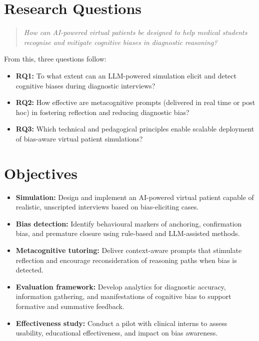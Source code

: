\section{Research Questions}
\label{sec:rq}

\begin{quote}
\textit{How can AI-powered virtual patients be designed to help medical students recognise and mitigate cognitive biases in diagnostic reasoning?}
\end{quote}

From this, three questions follow:

\begin{itemize}
  \item \textbf{RQ1:} To what extent can an LLM-powered simulation elicit and detect cognitive biases during diagnostic interviews?
  \item \textbf{RQ2:} How effective are metacognitive prompts (delivered in real time or post hoc) in fostering reflection and reducing diagnostic bias?
  \item \textbf{RQ3:} Which technical and pedagogical principles enable scalable deployment of bias-aware virtual patient simulations?
\end{itemize}

\section{Objectives}
\label{sec:ae2}

\begin{itemize}
  \item \textbf{Simulation:} Design and implement an AI-powered virtual patient capable of realistic, unscripted interviews based on bias-eliciting cases.
  \item \textbf{Bias detection:} Identify behavioural markers of anchoring, confirmation bias, and premature closure using rule-based and LLM-assisted methods.
  \item \textbf{Metacognitive tutoring:} Deliver context-aware prompts that stimulate reflection and encourage reconsideration of reasoning paths when bias is detected.
  \item \textbf{Evaluation framework:} Develop analytics for diagnostic accuracy, information gathering, and manifestations of cognitive bias to support formative and summative feedback.
  \item \textbf{Effectiveness study:} Conduct a pilot with clinical interns to assess usability, educational effectiveness, and impact on bias awareness.
\end{itemize}

